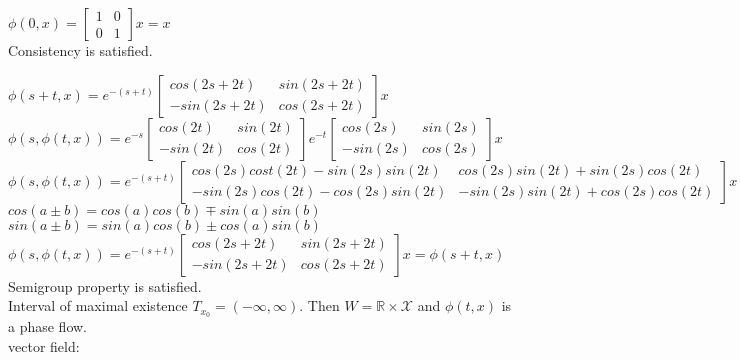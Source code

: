 \documentclass[12pt,letter]{article}
\newcommand{\R}{\mathbb{R}}
\begin{document}
\begin{itemize}
  $\phi(0,x)=\begin{bmatrix}1 & 0 \\ 0 & 1 \end{bmatrix} x = x$\\

  Consistency is satisfied.\\

  \pagebreak
  
  $\phi(s+t,x)=
  e^{-(s+t)}\begin{bmatrix}
    cos(2s+2t) & sin(2s+2t) \\
    -sin(2s+2t) & cos(2s+2t) \end{bmatrix}
  x$\\
  
  $\phi(s,\phi(t,x))=
  e^{-s}\begin{bmatrix}cos(2t) & sin(2t) \\ -sin(2t) & cos(2t) \end{bmatrix}
  e^{-t}\begin{bmatrix}cos(2s) & sin(2s) \\ -sin(2s) & cos(2s) \end{bmatrix}
  x $\\
  $\phi(s,\phi(t,x))=
  e^{-(s+t)}\begin{bmatrix}
    cos(2s)cost(2t)-sin(2s)sin(2t) & cos(2s)sin(2t)+sin(2s)cos(2t) \\
    -sin(2s)cos(2t)-cos(2s)sin(2t) & -sin(2s)sin(2t)+cos(2s)cos(2t) \end{bmatrix}
  x $\\

  $cos(a \pm b)=cos(a)cos(b) \mp sin(a)sin(b)$\\
  $sin(a \pm b)=sin(a)cos(b) \pm cos(a)sin(b)$\\

  $\phi(s,\phi(t,x))=e^{-(s+t)}\begin{bmatrix}
    cos(2s+2t) & sin(2s+2t) \\
    -sin(2s+2t) & cos(2s+2t) \end{bmatrix}
  x=\phi(s+t,x)$\\

  Semigroup property is satisfied.\\

  Interval of maximal existence $T_{x_0} = (-\infty, \infty)$. Then $W=\R \times \mathcal{X}$ and $\phi(t,x)$ is a phase flow.\\
  
  vector field:\\


\end{itemize}
\end{document}

